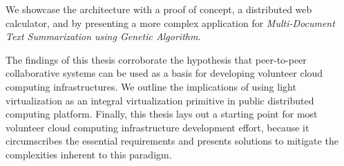 \documentclass{article}
\begin{document}
We showcase the architecture with a proof of concept, a distributed web calculator, and by
presenting a more complex application for \emph{Multi-Document Text Summarization using
  Genetic Algorithm}. 

The findings of this thesis corroborate the hypothesis that peer-to-peer collaborative
systems can be used as a basis for developing volunteer cloud computing
infrastructures. We outline the implications of using light virtualization as an integral
virtualization primitive in public distributed computing platform. Finally, this thesis
lays out a starting point for most volunteer cloud computing infrastructure development
effort, because it circumscribes the essential requirements and presents solutions to
mitigate the complexities inherent to this paradigm.
\end{document}
